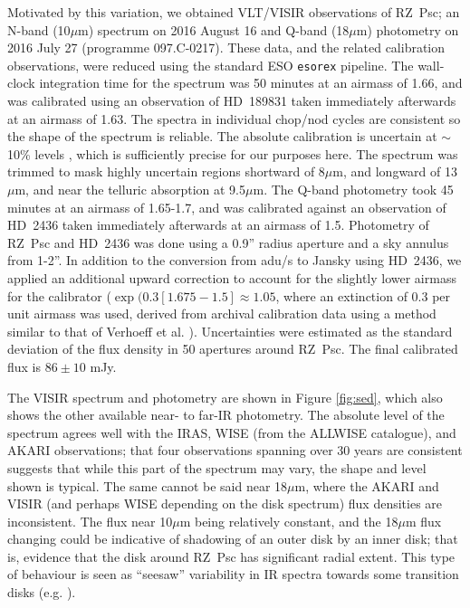 \documentclass[]{rsos}
\begin{document}
Motivated by this variation, we obtained VLT/VISIR observations of RZ~Psc; an N-band
(10$\mu$m) spectrum on 2016 August 16 and Q-band (18$\mu$m) photometry on 2016 July 27
(programme 097.C-0217). These data, and the related calibration observations, were
reduced using the standard ESO \texttt{esorex} pipeline. The wall-clock integration time
for the spectrum was 50 minutes at an airmass of 1.66, and was calibrated using an
observation of HD~189831 taken immediately afterwards at an airmass of 1.63. The spectra
in individual chop/nod cycles are consistent so the shape of the spectrum is
reliable. The absolute calibration is uncertain at $\sim$10\% levels
\cite{2007A&A...476..279G}, which is sufficiently precise for our purposes here. The
spectrum was trimmed to mask highly uncertain regions shortward of 8$\mu$m, and longward
of 13 $\mu$m, and near the telluric absorption at 9.5$\mu$m. The Q-band photometry took
45 minutes at an airmass of 1.65-1.7, and was calibrated against an observation of
HD~2436 taken immediately afterwards at an airmass of 1.5. Photometry of RZ~Psc and
HD~2436 was done using a 0.9'' radius aperture and a sky annulus from 1-2''. In addition
to the conversion from adu/s to Jansky using HD~2436, we applied an additional upward
correction to account for the slightly lower airmass for the calibrator
($\exp(0.3 [1.675-1.5] \approx 1.05$, where an extinction of 0.3 per unit airmass was
used, derived from archival calibration data using a method similar to that of Verhoeff
et al. \cite{2012A&A...538A.101V}). Uncertainties were estimated as the standard
deviation of the flux density in 50 apertures around RZ~Psc. The final calibrated flux is
$86 \pm 10$ mJy.

The VISIR spectrum and photometry are shown in Figure \ref{fig:sed}, which also shows the
other available near- to far-IR photometry. The absolute level of the spectrum agrees
well with the IRAS, WISE (from the ALLWISE catalogue), and AKARI observations; that four
observations spanning over 30 years are consistent suggests that while this part of the
spectrum may vary, the shape and level shown is typical. The same cannot be said near
18$\mu$m, where the AKARI and VISIR (and perhaps WISE depending on the disk spectrum)
flux densities are inconsistent. The flux near 10$\mu$m being relatively constant, and
the 18$\mu$m flux changing could be indicative of shadowing of an outer disk by an inner
disk; that is, evidence that the disk around RZ~Psc has significant radial extent. This
type of behaviour is seen as ``seesaw'' variability in IR spectra towards some transition
disks (e.g. \cite{2011ApJ...728...49E,2012ApJ...748...71F}).
\end{document}
